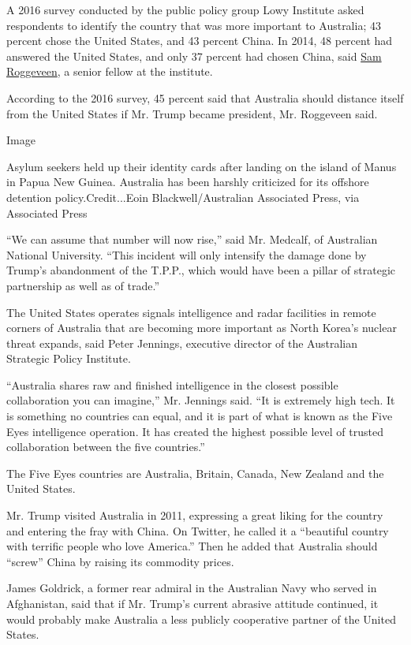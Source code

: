 A 2016 survey conducted by the public policy group Lowy Institute asked
respondents to identify the country that was more important to
Australia; 43 percent chose the United States, and 43 percent China. In
2014, 48 percent had answered the United States, and only 37 percent had
chosen China, said
\href{https://www.lowyinstitute.org/people/experts/publication/sam-roggeveen}{Sam
Roggeveen}, a senior fellow at the institute.

According to the 2016 survey, 45 percent said that Australia should
distance itself from the United States if Mr. Trump became president,
Mr. Roggeveen said.

Image

Asylum seekers held up their identity cards after landing on the island
of Manus in Papua New Guinea. Australia has been harshly criticized for
its offshore detention policy.Credit...Eoin Blackwell/Australian
Associated Press, via Associated Press

``We can assume that number will now rise,'' said Mr. Medcalf, of
Australian National University. ``This incident will only intensify the
damage done by Trump's abandonment of the T.P.P., which would have been
a pillar of strategic partnership as well as of trade.''

The United States operates signals intelligence and radar facilities in
remote corners of Australia that are becoming more important as North
Korea's nuclear threat expands, said Peter Jennings, executive director
of the Australian Strategic Policy Institute.

``Australia shares raw and finished intelligence in the closest possible
collaboration you can imagine,'' Mr. Jennings said. ``It is extremely
high tech. It is something no countries can equal, and it is part of
what is known as the Five Eyes intelligence operation. It has created
the highest possible level of trusted collaboration between the five
countries.''

The Five Eyes countries are Australia, Britain, Canada, New Zealand and
the United States.

Mr. Trump visited Australia in 2011, expressing a great liking for the
country and entering the fray with China. On Twitter, he called it a
``beautiful country with terrific people who love America.'' Then he
added that Australia should ``screw'' China by raising its commodity
prices.

James Goldrick, a former rear admiral in the Australian Navy who served
in Afghanistan, said that if Mr. Trump's current abrasive attitude
continued, it would probably make Australia a less publicly cooperative
partner of the United States.

